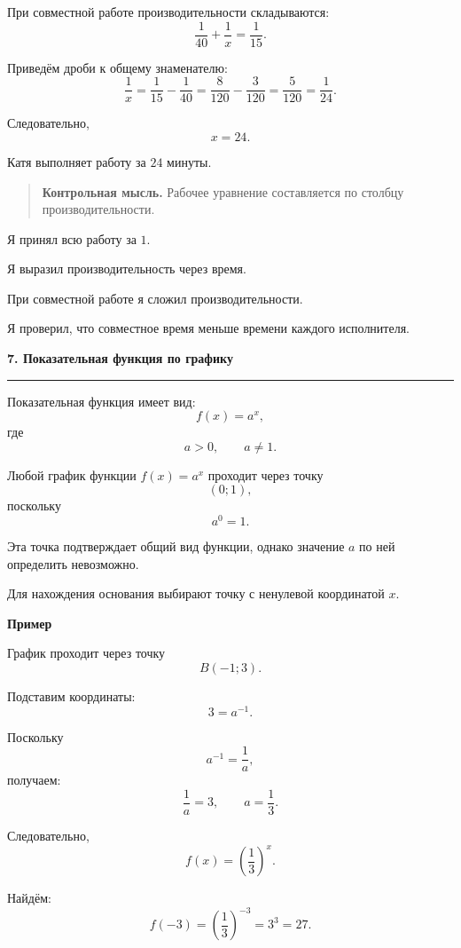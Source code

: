 \documentclass[a4paper,12pt]{article}
\newcommand{\topic}[1]{%
  \par\bigskip
  {\Large\bfseries\color{darkaccent}#1\par}
  \vspace{0.2em}
  {\color{accent}\rule{\linewidth}{0.7pt}}
  \vspace{0.55em}
}
\newcommand{\subtopic}[1]{%
  \par\medskip
  {\large\bfseries\color{darkaccent}#1\par}
  \vspace{0.2em}
}
\newcommand{\control}[1]{%
  \begin{quote}
    \color{darkaccent}\textbf{Контрольная мысль.}\;
    \color{textgray}#1
  \end{quote}
}
\begin{document}
При совместной работе производительности складываются:
\[
\frac1{40}+\frac1x=\frac1{15}.
\]

Приведём дроби к общему знаменателю:
\[
\frac1x
=
\frac1{15}-\frac1{40}
=
\frac8{120}-\frac3{120}
=
\frac5{120}
=
\frac1{24}.
\]

Следовательно,
\[
x=24.
\]

Катя выполняет работу за \(24\) минуты.

\control{Рабочее уравнение составляется по столбцу производительности.}

\begin{checklist}
  \item Я принял всю работу за \(1\).
  \item Я выразил производительность через время.
  \item При совместной работе я сложил производительности.
  \item Я проверил, что совместное время меньше времени каждого исполнителя.
\end{checklist}

\topic{7. Показательная функция по графику}

Показательная функция имеет вид:
\[
f(x)=a^x,
\]
где
\[
a>0,
\qquad
a\ne1.
\]

Любой график функции \(f(x)=a^x\) проходит через точку
\[
(0;1),
\]
поскольку
\[
a^0=1.
\]

Эта точка подтверждает общий вид функции, однако значение \(a\)
по ней определить невозможно.

Для нахождения основания выбирают точку с ненулевой координатой
\(x\).

\subtopic{Пример}

График проходит через точку
\[
B(-1;3).
\]

Подставим координаты:
\[
3=a^{-1}.
\]

Поскольку
\[
a^{-1}=\frac1a,
\]
получаем:
\[
\frac1a=3,
\qquad
a=\frac13.
\]

Следовательно,
\[
f(x)=\left(\frac13\right)^x.
\]

Найдём:
\[
f(-3)
=
\left(\frac13\right)^{-3}
=
3^3
=
27.
\]
\end{document}
